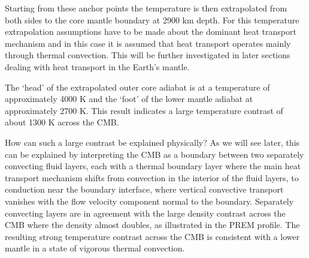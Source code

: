 Starting from these anchor points the temperature is then extrapolated 
from both sides to the core mantle boundary at 2900 km depth.
For this temperature extrapolation assumptions have to be made about 
the dominant heat transport mechanism and in this case it is assumed
that heat transport operates mainly through thermal convection.
This will be further investigated in later sections dealing with 
heat transport in the Earth's mantle.



\vspace{.5cm}

The `head' of the extrapolated outer core adiabat is at a temperature
of approximately 4000 K and the `foot' of the lower mantle adiabat at
approximately 2700 K.
This result indicates a large temperature contrast of about 1300 K
across the CMB.

How can such a large contrast be explained physically?
As we will see later, this can be explained by interpreting the CMB 
as a boundary between two separately convecting fluid layers, each with
a thermal boundary layer where the main heat transport mechanism shifts
from convection in the interior of the fluid layers, 
to conduction near the boundary interface, 
where vertical convective transport 
vanishes with the flow velocity component normal to the boundary. 
Separately convecting layers are in agreement with the large density
contrast across the CMB where the density almost doubles,
as illustrated in the PREM profile.
The resulting strong temperature contrast across the CMB is consistent 
with a lower mantle in a state of vigorous thermal convection.

